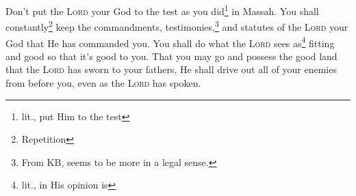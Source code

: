 \begin{inparaenum}
     Don't put the \textsc{Lord} your God to the test as you did\footnote{lit., put Him to the test} in Massah.%
     You shall constantly\footnote{Repetition} keep the commandments, testimonies,\footnote{From KB, seems to be more in a legal sense.} and statutes of the \textsc{Lord} your God that He has commanded you.%
     You shall do what the \textsc{Lord} sees as\footnote{lit., in His opinion is} fitting and good so that it's good to you. That you may go and possess the good land that the \textsc{Lord} has sworn to your fathers,%
     He shall drive out all of your enemies from before you, even as the \textsc{Lord} has spoken.%
\end{inparaenum}

